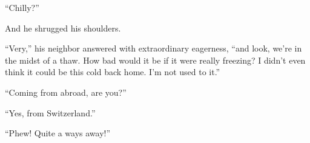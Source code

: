 ``Chilly?'' %

And he shrugged his shoulders.

``Very,'' his neighbor answered with extraordinary eagerness, ``and look, we're in the midst of a thaw. How bad would it be if it were really freezing? I didn't even think it could be this cold back home. I'm not used to it.'' %

``Coming from abroad, are you?'' %

``Yes, from Switzerland.'' %

``Phew! Quite a ways away!'' %

